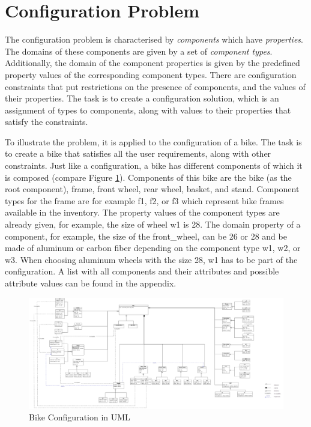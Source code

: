 \section{Configuration Problem }\label{sec: Problem Definition}

The configuration problem is characterised by \textit{components} which have  \textit{properties}. 
The domains of these components are given by a set of \textit{component types}.
Additionally, the domain of the component properties is given by the predefined property values of the corresponding component types.
There are configuration constraints that put restrictions on the presence of components, and the values of their properties.   
The task is to create a configuration solution, which is an assignment of types to components, along with values to their properties that satisfy the constraints. \newline 

To illustrate the problem, it is applied to the configuration of a bike. 
The task is to create a bike that satisfies all the user requirements, along with other constraints.
Just like a configuration, a bike has different components of which it is composed (compare Figure \ref{fig:bike}).
Components of this bike are the bike (as the root component), frame, front wheel, rear wheel, basket, and stand. 
Component types for the frame are for example f1, f2, or f3 which represent bike frames available in the inventory. 
The property values of the component types are already given, for example, the size of wheel w1 is 28.
The domain property of a component, for example, the size of the front\_wheel, can be 26 or 28 and be made of aluminum or carbon fiber depending on the component type w1, w2, or w3. 
When choosing aluminum wheels with the size 28, w1 has to be part of the configuration. 
A list with all components and their attributes and possible attribute values can be found in the appendix. 


\begin{landscape}
\begin{figure}[]
\centering
\caption{Bike Configuration in UML}
    \label{fig:bike}
\includegraphics[height=0.6\textheight,width=1.5\textwidth,keepaspectratio]{Bike.jpg}
\end{figure}

\end{landscape}


